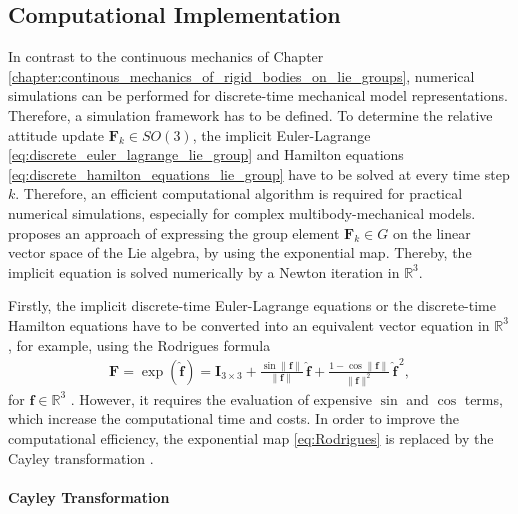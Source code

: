 \subsection{Computational Implementation}

\label{sec:discrete_computational_approach}

In contrast to the continuous mechanics of Chapter \ref{chapter:continous_mechanics_of_rigid_bodies_on_lie_groups}, numerical simulations 
can be performed for discrete-time mechanical model representations. 
Therefore, a simulation framework has to be defined. To determine the 
relative attitude update $\bm{F}_k \in SO(3)$, the implicit 
Euler-Lagrange \eqref{eq:discrete_euler_lagrange_lie_group} and Hamilton equations \eqref{eq:discrete_hamilton_equations_lie_group} 
have to be solved at every time step $k$. Therefore, an efficient 
computational algorithm is required for practical numerical 
simulations, especially for complex multibody-mechanical models. 
\cite{Lee2008} proposes an approach of expressing the group element 
$\bm{F}_k \in G$ on the linear vector space of the Lie algebra, by 
using the exponential map. Thereby, the implicit equation is 
solved numerically by a Newton iteration \cite{Marsden2001} 
in $\mathbb{R}^3$.

Firstly, the implicit discrete-time Euler-Lagrange equations 
or the discrete-time Hamilton equations have to be converted into 
an equivalent vector equation in $\mathbb{R}^3$, for example, 
using the Rodrigues formula
\begin{align}\label{eq:Rodrigues}
\bm{F}
=
\exp(\hat{\bm{f}})
=
\bm{I}_{3 \times 3}
+
\frac{\sin \lVert \bm{f} \rVert}{\lVert \bm{f} \rVert}\,\hat{\bm{f}}
+
\frac{1-\cos \lVert \bm{f} \rVert}{\lVert \bm{f} \rVert^2}\,\hat{\bm{f}}^{\,2},
\end{align}
for $\bm{f} \in \mathbb{R}^3$ \cite{MarsdenRatiu1999}. However, it requires the evaluation of expensive $\sin$ and $\cos$ terms, which increase the computational time and costs. In order to improve the computational efficiency, the exponential map \eqref{eq:Rodrigues} is replaced by the Cayley transformation \cite{Arieh_Cayley_Motivation}.


\paragraph{Cayley Transformation}

